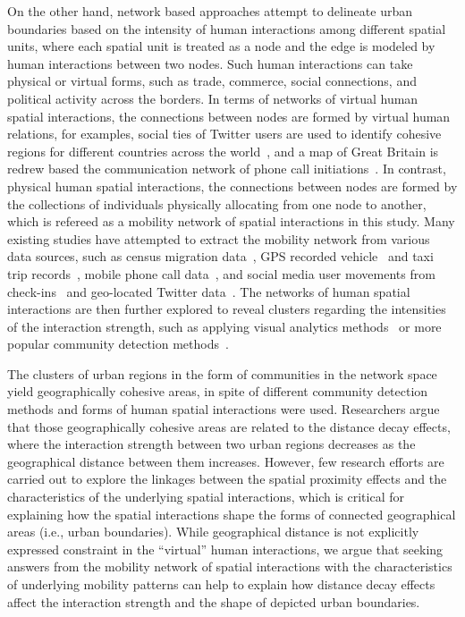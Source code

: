 \documentclass[]{tGIS2e}
\begin{document}
On the other hand, network based approaches attempt to delineate urban boundaries based on the intensity of human interactions among different spatial units, where each spatial unit is treated as a node and the edge is modeled by human interactions between two nodes.
Such human interactions can take physical or virtual forms, such as trade, commerce, social connections, and political activity across the borders.
In terms of networks of virtual human spatial interactions, the connections between nodes are formed by virtual human relations, for examples, social ties of Twitter users are used to identify cohesive regions for different countries across the world~\citep{kallus2015}, and a map of Great Britain is redrew based the communication network of phone call initiations~\citep{ratti2010}.
In contrast, physical human spatial interactions, the connections between nodes are formed by the collections of individuals physically allocating from one node to another, which is refereed as a mobility network of spatial interactions in this study.
Many existing studies have attempted to extract the mobility network from various data sources, such as census migration data~\citep{rae2009}, GPS recorded vehicle~\citep{rinzivillo2012} and taxi trip records~\citep{liu2015}, mobile phone call data~\citep{sobolevsky2013,zhong2014}, and social media user movements from check-ins~\citep{liu2014} and geo-located Twitter data~\citep{hawelka,gao2014}.
The networks of human spatial interactions are then further explored to reveal clusters regarding the intensities of the interaction strength, such as applying visual analytics methods~\citep{rae2009} or more popular community detection methods~\citep{coscia2011}.

The clusters of urban regions in the form of communities in the network space yield geographically cohesive areas, in spite of different community detection methods and forms of human spatial interactions were used.
Researchers argue that those geographically cohesive areas are related to the distance decay effects, where the interaction strength between two urban regions decreases as the geographical distance between them increases.
However, few research efforts are carried out to explore the linkages between the spatial proximity effects and the characteristics of the underlying spatial interactions, which is critical for explaining how the spatial interactions shape the forms of connected geographical areas (i.e., urban boundaries).
While geographical distance is not explicitly expressed constraint in the ``virtual'' human interactions, we argue that seeking answers from the mobility network of spatial interactions with the characteristics of underlying mobility patterns can help to explain how distance decay effects affect the interaction strength and the shape of depicted urban boundaries.  
\end{document}
